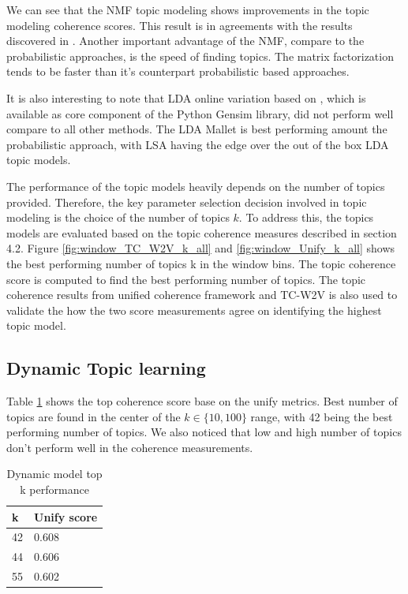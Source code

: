 We can see that the NMF topic modeling shows improvements in the topic modeling coherence scores. This result is in agreements with the results discovered in \cite{Greene2016}. Another important advantage of the NMF, compare to the probabilistic approaches, is the speed of finding topics. The matrix factorization tends to be faster than it's counterpart probabilistic based approaches.


It is also interesting to note that LDA online variation based on \cite{NIPS2010_3902}, which is available as core component of the Python Gensim library, did not perform well compare to all other methods. The LDA Mallet is best performing amount the probabilistic approach, with LSA having the edge over the out of the box LDA topic models. 


The performance of the topic models heavily depends on the number of topics provided. Therefore, the key parameter selection decision involved in topic modeling is the choice of the number of topics $k$. To address this, the topics models are evaluated based on the topic coherence measures described in section 4.2. Figure \ref{fig:window_TC_W2V_k_all} and \ref{fig:window_Unify_k_all} shows the best performing number of topics k in the window bins. The topic coherence score is computed to find the best performing number of topics. The topic coherence results from unified coherence framework and TC-W2V is also used to validate the how the two score measurements agree on identifying the highest topic model. 

\subsection{Dynamic Topic learning}
Table \ref{table:dynamictopk} shows the top coherence score base on the unify metrics. Best number of topics are found in the center of the $k \in \{10, 100\}$ range, with 42 being the best performing number of topics. We also noticed that low and high number of topics don't perform well in the coherence measurements. 

\begin{table}[H]
\centering
\caption{Dynamic model top k performance}
\label{table:dynamictopk}
\begin{tabular}{|l|l|}
\hline
k  & Unify score \\ \hline
42 & 0.608       \\ \hline
44 & 0.606       \\ \hline
55 & 0.602       \\ \hline
\end{tabular}
\end{table}

